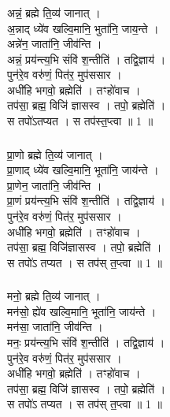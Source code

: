 \subsubsection{}
अन्नं॒ ब्रह्मे ति॒व्य॑ जानात् ।\\
अ॒न्नाद् ध्ये॑व खल्वि॒मानि॒ भुता॑नि॒ जाय॒न्ते । \\
अन्ने॑न॒ जाता॑नि॒ जीव॑न्ति ।\\
अन्नं॒ प्रय॑न्त्य॒भि संवि॑ श॒न्तीति॑ । तद्वि॒ज्ञाय॑ ।\\
पुन॑रे॒व वरु॑णं॒ पित॑र॒ मुप॑ससार ।\\
अधी॑हि भगवो॒ ब्रह्मेति॑ । तꣳहो॑वाच ।\\
तप॑सा॒ ब्रह्म॒ विजि॑ ज्ञासस्व । तपो॒ ब्रह्मेति॑ ।\\
स तपो॑ऽतप्यत । स तप॑स्त॒प्त्वा ॥ 1 ॥\\
\subsubsection{}
प्रा॒णो ब्रह्मे  ति॒व्य॑ जानात् ।\\
प्रा॒णाद् ध्ये॑व खल्वि॒मानि॒ भूता॑नि॒ जाय॑न्ते । \\
प्रा॒णेन॒ जाता॑नि॒ जीव॑न्ति ।\\
प्रा॒णं प्रय॑न्त्य॒भि संवि॑ श॒न्तीति॑ । तद्वि॒ज्ञाय॑ ।\\
पुन॑रे॒व वरु॑णं॒ पित॑र॒ मुप॑ससार ।\\
अधी॑हि भगवो॒ ब्रह्मेति॑ । तꣳहो॑वाच ।\\
तप॑सा॒ ब्रह्म॒ विजि॑ज्ञासस्व । तपो॒ ब्रह्मेति॑ ।\\
स तपो॑ऽ तप्यत । स तप॑स् त॒प्त्वा ॥ 1 ॥\\
\subsubsection{}
मनो॒ ब्रह्मे  ति॒व्य॑ जानात् ।\\
मन॑सो॒ ह्ये॑व खल्वि॒मानि॒ भूता॑नि॒ जाय॑न्ते । \\
मन॑सा॒ जाता॑नि॒ जीव॑न्ति ।\\
मनः॒ प्रय॑न्त्य॒भि संवि॑ श॒न्तीति॑ । तद्वि॒ज्ञाय॑ ।\\
पुन॑रे॒व वरु॑णं॒ पित॑र॒ मुप॑ससार ।\\
अधी॑हि भगवो॒ ब्रह्मेति॑ । तꣳहो॑वाच ।\\
तप॑सा॒ ब्रह्म॒ विजि॑ ज्ञासस्व । तपो॒ ब्रह्मेति॑ ।\\
स तपो॑ऽ तप्यत । स तप॑स् त॒प्त्वा ॥ 1 ॥\\
